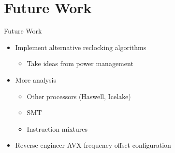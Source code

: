 \section{Future Work}
\begin{frame}[t]{Future Work}
	\begin{itemize}
		\item Implement alternative reclocking algorithms
		\begin{itemize}
			\item Take ideas from power management
		\end{itemize}
		\item More analysis
		\begin{itemize}
			\item Other processors (Haswell, Icelake)
			\item SMT
			\item Instruction mixtures
		\end{itemize}
		\item Reverse engineer AVX frequency offset configuration
	\end{itemize}
\end{frame}